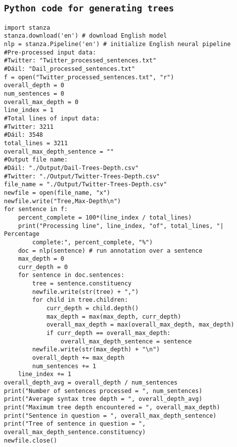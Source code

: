 \documentclass[a4paper,11pt]{article}
\begin{document}
\begin{appendices}
\section{\texttt{Python code for generating trees}}
\begin{verbatim}
import stanza
stanza.download('en') # download English model
nlp = stanza.Pipeline('en') # initialize English neural pipeline
#Pre-processed input data:
#Twitter: "Twitter_processed_sentences.txt"
#Dáil: "Dail_processed_sentences.txt"
f = open("Twitter_processed_sentences.txt", "r")
overall_depth = 0
num_sentences = 0
overall_max_depth = 0
line_index = 1
#Total lines of input data:
#Twitter: 3211
#Dáil: 3548
total_lines = 3211
overall_max_depth_sentence = ""
#Output file name:
#Dáil: "./Output/Dail-Trees-Depth.csv"
#Twitter: "./Output/Twitter-Trees-Depth.csv"
file_name = "./Output/Twitter-Trees-Depth.csv"
newfile = open(file_name, "x")
newfile.write("Tree,Max-Depth\n")
for sentence in f:
    percent_complete = 100*(line_index / total_lines)
    print("Processing line", line_index, "of", total_lines, "| Percentage
        complete:", percent_complete, "%")
    doc = nlp(sentence) # run annotation over a sentence
    max_depth = 0
    curr_depth = 0
    for sentence in doc.sentences:
        tree = sentence.constituency
        newfile.write(str(tree) + ",")
        for child in tree.children:
            curr_depth = child.depth()
            max_depth = max(max_depth, curr_depth)
            overall_max_depth = max(overall_max_depth, max_depth)
            if curr_depth == overall_max_depth:
                overall_max_depth_sentence = sentence
        newfile.write(str(max_depth) + "\n")
        overall_depth += max_depth
        num_sentences += 1
    line_index += 1
overall_depth_avg = overall_depth / num_sentences
print("Number of sentences processed = ", num_sentences)
print("Average syntax tree depth = ", overall_depth_avg)
print("Maximum tree depth encountered = ", overall_max_depth)
print("Sentence in question = ", overall_max_depth_sentence)
print("Tree of sentence in question = ", overall_max_depth_sentence.constituency)
newfile.close()
\end{verbatim}
\end{appendices}
\end{document}
